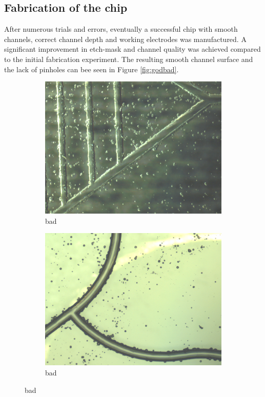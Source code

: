 \documentclass[final]{jyflluk}
\begin{document}
\subsection{Fabrication of the chip}
After numerous trials and errors, eventually a successful chip with smooth channels, correct channel depth and working electrodes was manufactured. A significant improvement in etch-mask and channel quality was achieved compared to the initial fabrication experiment. The resulting smooth channel surface and the lack of pinholes can bee seen in Figure \ref{fig:godbad}. 
\begin{figure}[!h]
    \centering
    \begin{subfigure}{0.48\textwidth}
        \centering
        \includegraphics[width=\linewidth]{optical/bad1.png} 
        \caption{bad} \label{fig:bad0}
    \end{subfigure}
    \hfill
    \begin{subfigure}{0.48\textwidth}
        \centering
        \includegraphics[width=\linewidth]{optical/bad2.png} 
        \caption{bad} \label{fig:bad1}
    \end{subfigure}
    

\end{figure}
\end{document}
